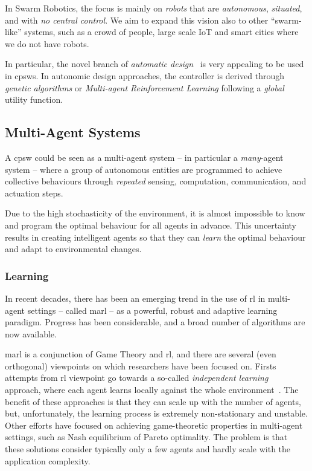 \documentclass[11pt]{article}
\begin{document}
In Swarm Robotics, the focus is mainly on \textit{robots} that are \emph{autonomous}, \emph{situated}, and with \emph{no central control}. 
%
We aim to expand this vision also to other ``swarm-like'' systems, such as a crowd of people, large scale IoT and smart cities where we do not have robots. 

In particular, the novel branch of \textit{automatic design}~\cite{DBLP:journals/firai/FrancescaB16} is very appealing to be used in \acp{cpsw}. 
%
In autonomic design approaches, the controller is derived through \textit{genetic algorithms} or \textit{Multi-agent Reinforcement Learning} following a \textit{global} utility function. 
\subsection{Multi-Agent Systems}
A \ac{cpsw} could be seen as a multi-agent system -- in particular a \emph{many}-agent system -- where a group of autonomous entities are programmed to achieve collective behaviours through \emph{repeated} sensing, computation, communication, and actuation steps.

Due to the high stochasticity of the environment, it is almost impossible to know and program the optimal behaviour for all agents in advance.
%
This uncertainty results in creating intelligent agents so that they can \emph{learn} the optimal behaviour and adapt to environmental changes.
\subsubsection{Learning}
In recent decades, there has been an emerging trend in the use of \ac{rl} 
in multi-agent settings -- called \ac{marl} -- as a powerful, robust and adaptive learning paradigm.
%
Progress has been considerable, and a broad number of algorithms are now available.

\ac{marl} is a conjunction of Game Theory and \ac{rl}, 
 and there are several (even orthogonal) viewpoints on which researchers have been focused on.
%
Firsts attempts from \ac{rl} viewpoint go towards a so-called \textit{independent learning}~\cite{DBLP:journals/tsmc/BusoniuBS08} approach, where each agent learns locally against the whole environment~\cite{DBLP:conf/icml/Tan93}.
%
The benefit of these approaches is that they can scale up with the number of agents, but, unfortunately, the learning process is extremely non-stationary and unstable.
%
Other efforts have focused on achieving game-theoretic properties in multi-agent settings, such as Nash equilibrium of Pareto optimality.
%
The problem is that these solutions consider typically only a few agents and hardly scale with the application complexity.
\end{document}
